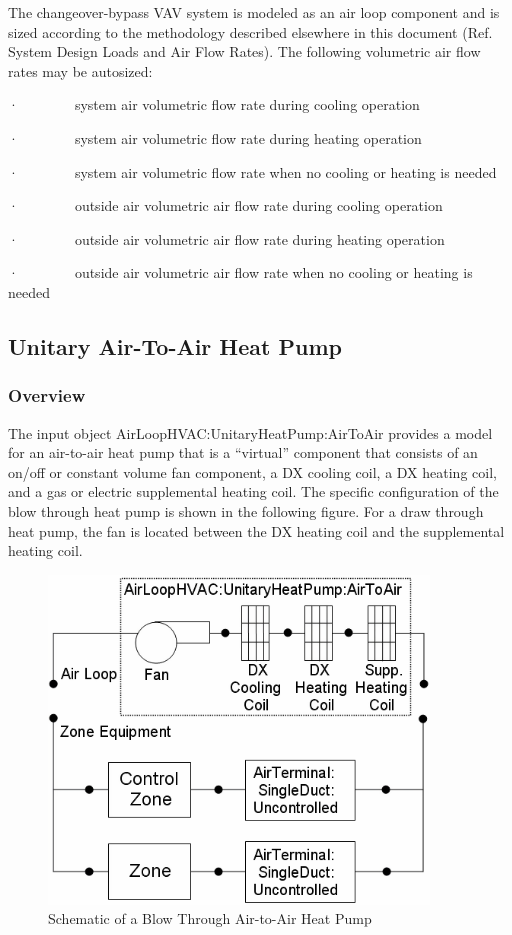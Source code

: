 The changeover-bypass VAV system is modeled as an air loop component and is sized according to the methodology described elsewhere in this document (Ref. System Design Loads and Air Flow Rates). The following volumetric air flow rates may be autosized:

·~~~~~~~~system air volumetric flow rate during cooling operation

·~~~~~~~~system air volumetric flow rate during heating operation

·~~~~~~~~system air volumetric flow rate when no cooling or heating is needed

·~~~~~~~~outside air volumetric air flow rate during cooling operation

·~~~~~~~~outside air volumetric air flow rate during heating operation

·~~~~~~~~outside air volumetric air flow rate when no cooling or heating is needed

\subsection{Unitary Air-To-Air Heat Pump}\label{unitary-air-to-air-heat-pump}

\subsubsection{Overview}\label{overview-3}

The input object AirLoopHVAC:UnitaryHeatPump:AirToAir provides a model for an air-to-air heat pump that is a ``virtual'' component that consists of an on/off or constant volume fan component, a DX cooling coil, a DX heating coil, and a gas or electric supplemental heating coil. The specific configuration of the blow through heat pump is shown in the following figure. For a draw through heat pump, the fan is located between the DX heating coil and the supplemental heating coil.

\begin{figure}[hbtp] %
\centering
\includegraphics[width=0.9\textwidth, height=0.9\textheight, keepaspectratio=true]{media/image5106.png}
\caption{Schematic of a Blow Through Air-to-Air Heat Pump \protect \label{fig:schematic-of-a-blow-through-air-to-air-heat}}
\end{figure}

